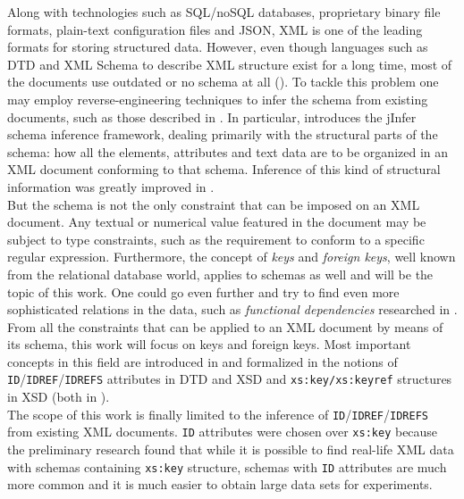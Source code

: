 \label{chapter-preface}

Along with technologies such as SQL/noSQL databases, proprietary binary file formats, plain-text configuration files and JSON, XML is one of the leading formats for storing structured data. However, even though languages such as DTD and XML Schema to describe XML structure exist for a long time, most of the documents use outdated or no schema at all (\cite{1802522}). To tackle this problem one may employ reverse-engineering techniques to infer the schema from existing documents, such as those described in \cite{ahonen, bex, vyhnanovska}. In particular, \cite{archdoc} introduces the jInfer schema inference framework, dealing primarily with the structural parts of the schema: how all the elements, attributes and text data are to be organized in an XML document conforming to that schema. Inference of this kind of structural information was greatly improved in \cite{anti}.\\

But the schema is not the only constraint that can be imposed on an XML document. Any textual or numerical value featured in the document may be subject to type constraints, such as the requirement to conform to a specific regular expression. Furthermore, the concept of \textit{keys} and \textit{foreign keys}, well known from the relational database world, applies to schemas as well and will be the topic of this work. One could go even further and try to find even more sophisticated relations in the data, such as \textit{functional dependencies} researched in \cite{sviro}.\\

From all the constraints that can be applied to an XML document by means of its schema, this work will focus on keys and foreign keys. Most important concepts in this field are introduced in \cite{keX} and formalized in the notions of \texttt{ID}/\.\texttt{IDREF}/\.\texttt{IDREFS} attributes in DTD and XSD and \texttt{xs:key/xs:keyref} structures in XSD (both in \cite{Bray:08:EML}).\\

The scope of this work is finally limited to the inference of \texttt{ID}/\.\texttt{IDREF}/\.\texttt{IDREFS} from existing XML documents. \texttt{ID} attributes were chosen over \texttt{xs:key} because the preliminary research found that while it is possible to find real-life XML data with schemas containing \texttt{xs:key} structure, schemas with \texttt{ID} attributes are much more common and it is much easier to obtain large data sets for experiments. %

